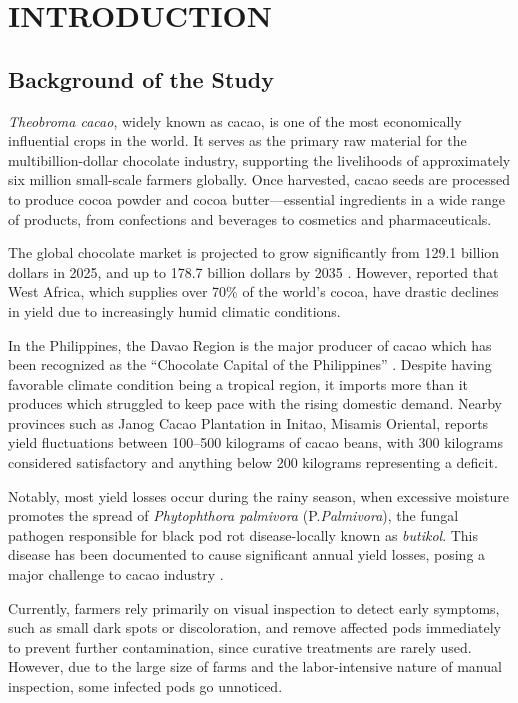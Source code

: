 \chapter{INTRODUCTION}

{\baselineskip

	\section{Background of the Study}
\textit{Theobroma cacao}, widely known as cacao, is one of the most economically influential crops in the world. It serves as the primary raw material for the multibillion-dollar chocolate industry, supporting the livelihoods of approximately six million small-scale farmers globally. Once harvested, cacao seeds are processed to produce cocoa powder and cocoa butter—essential ingredients in a wide range of products, from confections and beverages to cosmetics and pharmaceuticals.

The global chocolate market is projected to grow significantly from 129.1 billion dollars in 2025, and up to 178.7 billion dollars by 2035 \citep{FutureMarketInsights2025ChocolateForecast}. However, \cite{Exquisito2025CocoaShortage} reported that West Africa, which supplies over 70\% of the world’s cocoa, have drastic declines in yield due to increasingly humid climatic conditions. 

In the Philippines, the Davao Region is the major producer of cacao which has been recognized as the “Chocolate Capital of the Philippines” \citep{PCAF2021}. Despite having favorable climate condition being a tropical region, it imports more than it produces which struggled to keep pace with the rising domestic demand. Nearby provinces such as Janog Cacao Plantation in Initao, Misamis Oriental, reports yield fluctuations between 100–500 kilograms of cacao beans, with 300 kilograms considered satisfactory and anything below 200 kilograms representing a deficit.

Notably, most yield losses occur during the rainy season, when excessive moisture promotes the spread of \textit{Phytophthora palmivora} (P.\textit{Palmivora}), the fungal pathogen responsible for black pod rot disease-locally known as \textit{butikol}. This disease has been documented to cause significant annual yield losses, posing a major challenge to cacao industry \citep{Avila2023}.

Currently, farmers rely primarily on visual inspection to detect early symptoms, such as small dark spots or discoloration, and remove affected pods immediately to prevent further contamination, since curative treatments are rarely used. However, due to the large size of farms and the labor-intensive nature of manual inspection, some infected pods go unnoticed.

}
